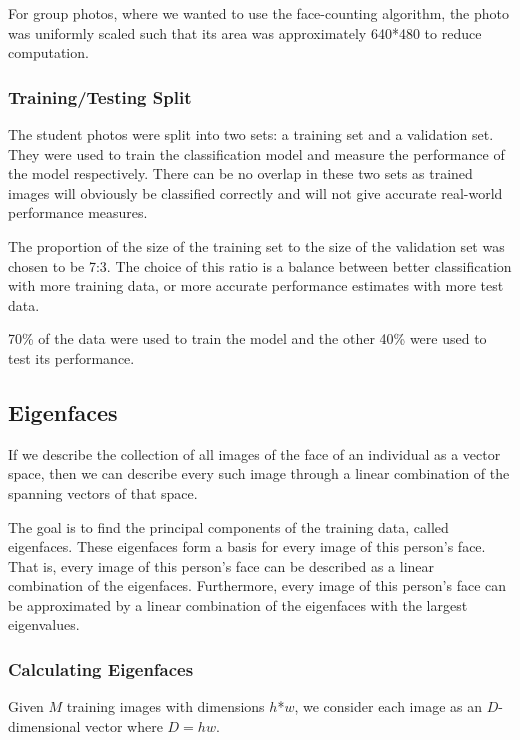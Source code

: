 \documentclass{article}
\begin{document}
For group photos, where we wanted to use the face-counting algorithm, the photo was uniformly scaled such that its area was approximately 640*480 to reduce computation.

\subsubsection{Training/Testing Split}
\label{sec:split}
The student photos were split into two sets: a training set and a validation set. They were used to train the classification model and measure the performance of the model respectively. There can be no overlap in these two sets as trained images will obviously be classified correctly and will not give accurate real-world performance measures.

The proportion of the size of the training set to the size of the validation set was chosen to be 7:3. The choice of this ratio is a balance between better classification with more training data, or more accurate performance estimates with more test data.

70\% of the data were used to train the model and the other 40\% were used to test its performance.

\subsection{Eigenfaces}
If we describe the collection of all images of the face of an individual as a vector space, then we can describe every such image through a linear combination of the spanning vectors of that space.

The goal is to find the principal components of the training data, called eigenfaces. These eigenfaces form a basis for every image of this person’s face. That is, every image of this person’s face can be described as a linear combination of the eigenfaces. Furthermore, every image of this person’s face can be approximated by a linear combination of the eigenfaces with the largest eigenvalues.

\subsubsection{Calculating Eigenfaces}
Given $M$ training images with dimensions $h$*$w$, we consider each image as an $D$-dimensional vector where $D = hw$.
\end{document}
